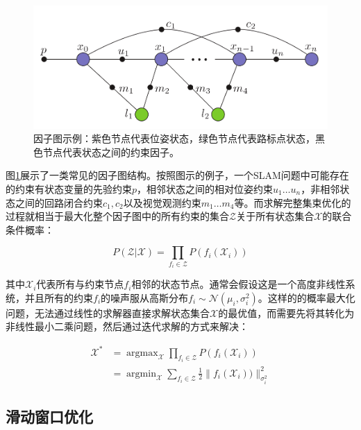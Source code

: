 \begin{figure}[htbp]
    \centering
    \includegraphics[width=.6\textwidth]{figs/factor_graph.png}
    \caption{因子图示例\citep{kaess2012isam2}：紫色节点代表位姿状态，绿色节点代表路标点状态，黑色节点代表状态之间的约束因子。}
    \label{fig:factor_graph}
\end{figure}

图\ref{fig:factor_graph}展示了一类常见的因子图结构。按照图示的例子，一个SLAM问题中可能存在的约束有状态变量的先验约束$p$，相邻状态之间的相对位姿约束$u_1 \dots u_n$，非相邻状态之间的回路闭合约束$c_1,c_2$以及视觉观测约束$m_1 \dots m_4$等。而求解完整集束优化的过程就相当于最大化整个因子图中的所有约束的集合$\mathcal{Z}$关于所有状态集合$\mathcal{X}$的联合条件概率：

\begin{equation}
    P(\mathcal{Z}|\mathcal{X}) = \prod_{f_i\in\mathcal{Z}} P(f_i(\mathcal{X}_i))
\end{equation}

其中$\mathcal{X}_i$代表所有与约束节点$f_i$相邻的状态节点。通常会假设这是一个高度非线性系统，并且所有的约束$f_i$的噪声服从高斯分布$f_i\sim\mathcal{N}(\mu_i, \sigma_i^2)$。这样的的概率最大化问题，无法通过线性的求解器直接求解状态集合$\mathcal{X}$的最优值，而需要先将其转化为非线性最小二乘问题，然后通过迭代求解的方式来解决：

\begin{equation}
\begin{aligned}
    \mathcal{X}^\ast &= \mathop{\arg\max}_{\mathcal{X}}
                        \prod_{f_i\in\mathcal{Z}} P(f_i(\mathcal{X}_i)) \\
                     &= \mathop{\arg\min}_{\mathcal{X}}
                        \sum_{f_i\in\mathcal{Z}} \frac{1}{2}
                        \lVert f_i(\mathcal{X}_i)) \rVert_{\sigma_i^2}^2
\end{aligned}
\end{equation}

\subsection{滑动窗口优化}

